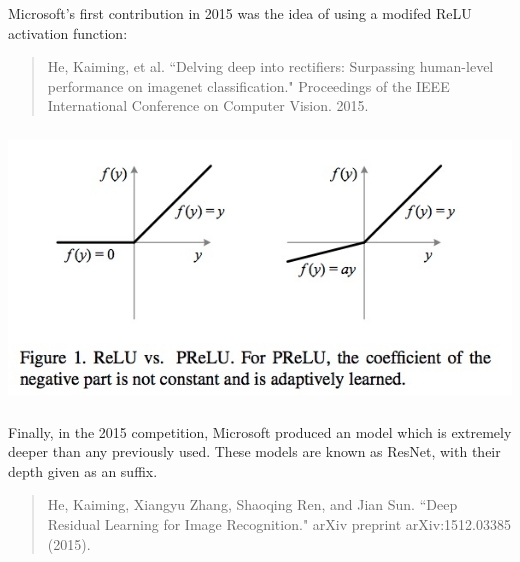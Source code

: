 \documentclass[xetex,mathserif,serif,aspectratio=169]{beamer}
\begin{document}
\begin{frame}[fragile] \frametitle{} \oldB \small

\textbf{}

\end{frame}

\begin{frame}[fragile] \frametitle{} \oldB \small


Microsoft's first contribution in 2015 was the idea of using
a modifed ReLU activation function:
\begin{quote}
He, Kaiming, et al. ``Delving deep into rectifiers: Surpassing human-level performance on imagenet classification." Proceedings of the IEEE International Conference on Computer Vision. 2015.
\end{quote}

\end{frame}

\begin{frame}[fragile] \frametitle{} \oldB \small

\begin{center}
\includegraphics[width=\textwidth]{img/prelunetActivation.jpg}
\end{center}

\end{frame}

\begin{frame}[fragile] \frametitle{} \oldB \small


Finally, in the 2015 competition, Microsoft produced an model
which is extremely deeper than any previously used. These models
are known as ResNet, with their depth given as an suffix.
\begin{quote}
He, Kaiming, Xiangyu Zhang, Shaoqing Ren, and Jian Sun.
``Deep Residual Learning for Image Recognition." arXiv preprint
arXiv:1512.03385 (2015).
\end{quote}

\end{frame}
\end{document}
